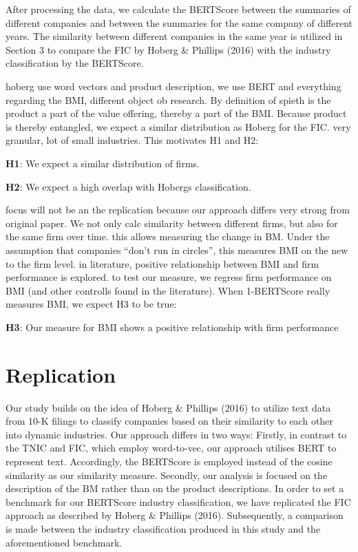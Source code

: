 \documentclass[
]{article}
\begin{document}
After processing the data, we calculate the BERTScore between the
summaries of different companies and between the summaries for the same
company of different years. The similarity between different companies
in the same year is utilized in Section 3 to compare the FIC by Hoberg
\& Phillips (2016) with the industry classification by the BERTScore.

hoberg use word vectors and product description, we use BERT and
everything regarding the BMI, different object ob research. By
definition of spieth is the product a part of the value offering,
thereby a part of the BMI. Because product is thereby entangled, we
expect a similar distribution as Hoberg for the FIC. very granular, lot
of small industries. This motivates H1 and H2:

\textbf{H1}: We expect a similar distribution of firms.

\textbf{H2}: We expect a high overlap with Hobergs classification.

focus will not be an the replication because our approach differs very
strong from original paper. We not only calc similarity between
different firms, but also for the same firm over time. this allows
measuring the change in BM. Under the assumption that companies ``don't
run in circles'', this measures BMI on the new to the firm level. in
literature, positive relationship between BMI and firm performance is
explored. to test our measure, we regress firm performance on BMI (and
other controlls found in the literature). When 1-BERTScore really
measures BMI, we expect H3 to be true:

\textbf{H3}: Our measure for BMI shows a positive relationship with firm
performance

\section{Replication}\label{replication}

Our study builds on the idea of Hoberg \& Phillips (2016) to utilize
text data from 10-K filings to classify companies based on their
similarity to each other into dynamic industries. Our approach differs
in two ways: Firstly, in contrast to the TNIC and FIC, which employ
word-to-vec, our approach utilises BERT to represent text. Accordingly,
the BERTScore is employed instead of the cosine similarity as our
similarity measure. Secondly, our analysis is focused on the description
of the BM rather than on the product descriptions. In order to set a
benchmark for our BERTScore industry classification, we have replicated
the FIC approach as described by Hoberg \& Phillips (2016).
Subsequently, a comparison is made between the industry classification
produced in this study and the aforementioned benchmark.
\end{document}
